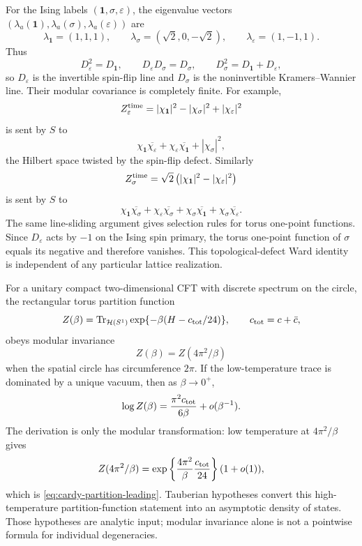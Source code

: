 For the Ising labels \((\mathbf 1,\sigma,\varepsilon)\), the eigenvalue
vectors \((\lambda_a(\mathbf 1),\lambda_a(\sigma),\lambda_a(\varepsilon))\)
are
\[
  \lambda_{\mathbf 1}=(1,1,1),\qquad
  \lambda_\sigma=(\sqrt2,0,-\sqrt2),\qquad
  \lambda_\varepsilon=(1,-1,1).
\]
Thus
\[
  D_\varepsilon^2=D_{\mathbf 1},\qquad
  D_\varepsilon D_\sigma=D_\sigma,\qquad
  D_\sigma^2=D_{\mathbf 1}+D_\varepsilon,
\]
so \(D_\varepsilon\) is the invertible spin-flip line and \(D_\sigma\) is the
noninvertible Kramers--Wannier line.  Their modular covariance is completely
finite.  For example,
\[
  Z_\varepsilon^{\rm time}
  =
  |\chi_{\mathbf 1}|^2-|\chi_\sigma|^2+|\chi_\varepsilon|^2
\]
is sent by \(S\) to
\[
  \chi_{\mathbf 1}\overline{\chi_\varepsilon}
  +\chi_\varepsilon\overline{\chi_{\mathbf 1}}
  +|\chi_\sigma|^2,
\]
the Hilbert space twisted by the spin-flip defect.  Similarly
\[
  Z_\sigma^{\rm time}
  =
  \sqrt2\left(|\chi_{\mathbf 1}|^2-|\chi_\varepsilon|^2\right)
\]
is sent by \(S\) to
\[
  \chi_{\mathbf 1}\overline{\chi_\sigma}
  +\chi_\varepsilon\overline{\chi_\sigma}
  +\chi_\sigma\overline{\chi_{\mathbf 1}}
  +\chi_\sigma\overline{\chi_\varepsilon}.
\]
The same line-sliding argument gives selection rules for torus one-point
functions.  Since \(D_\varepsilon\) acts by \(-1\) on the Ising spin primary,
the torus one-point function of \(\sigma\) equals its negative and therefore
vanishes.  This topological-defect Ward identity is independent of any
particular lattice realization.

For a unitary compact two-dimensional CFT with discrete spectrum on the
circle, the rectangular torus partition function
\[
  Z(\beta)=\operatorname{Tr}_{\mathcal H(S^1)}
  \exp\{-\beta(H-c_{\rm tot}/24)\},
  \qquad c_{\rm tot}=c+\bar c,
\]
obeys modular invariance
\[
  Z(\beta)=Z(4\pi^2/\beta)
\]
when the spatial circle has circumference \(2\pi\).  If the low-temperature
trace is dominated by a unique vacuum, then as \(\beta\to0^+\),
\begin{equation}
  \log Z(\beta)
  =
  \frac{\pi^2 c_{\rm tot}}{6\beta}+o(\beta^{-1}).
  \label{eq:cardy-partition-leading}
\end{equation}
The derivation is only the modular transformation:
low temperature at \(4\pi^2/\beta\) gives
\[
  Z(4\pi^2/\beta)
  =
  \exp\left\{\frac{4\pi^2}{\beta}\frac{c_{\rm tot}}{24}\right\}
  (1+o(1)),
\]
which is \eqref{eq:cardy-partition-leading}.  Tauberian hypotheses convert
this high-temperature partition-function statement into an asymptotic density
of states.  Those hypotheses are analytic input; modular invariance alone is
not a pointwise formula for individual degeneracies.

